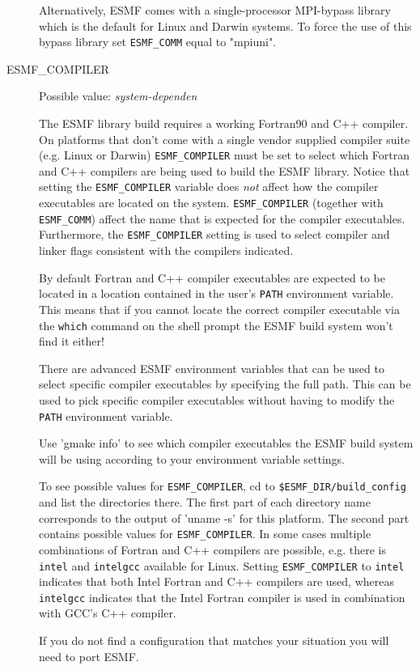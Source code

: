 \begin{description}
Alternatively, ESMF comes with a single-processor MPI-bypass library which is
the default for Linux and Darwin systems. To force the use of this bypass
library set {\tt ESMF\_COMM} equal to "mpiuni".

\item[ESMF\_COMPILER]
Possible value: {\em system-dependen}

The ESMF library build requires a working Fortran90 and C++ compiler. On 
platforms that don't come with a single vendor supplied compiler suite
(e.g. Linux or Darwin) {\tt ESMF\_COMPILER} must be set to select which Fortran
and C++ compilers are being used to build the ESMF library. Notice that setting
the {\tt ESMF\_COMPILER} variable does {\em not} affect how the compiler
executables are located on the system. {\tt ESMF\_COMPILER} (together with
{\tt ESMF\_COMM}) affect the name that is expected for the compiler executables.
Furthermore, the {\tt ESMF\_COMPILER} setting is used to select compiler and
linker flags consistent with the compilers indicated.

By default Fortran and C++ compiler executables are expected to be located in
a location contained in the user's {\tt PATH} environment variable. This means
that if you cannot locate the correct compiler executable via the {\tt which}
command on the shell prompt the ESMF build system won't find it either!

There are advanced ESMF environment variables that can be used to select 
specific compiler executables by specifying the full path. This can be used to
pick specific compiler executables without having to modify the {\tt PATH}
environment variable.

Use 'gmake info' to see which compiler executables the ESMF build system will
be using according to your environment variable settings.

To see possible values for {\tt ESMF\_COMPILER}, cd to 
{\tt \$ESMF\_DIR/build\_config} and list the directories there. The first part 
of each directory name corresponds to the output of 'uname -s' for this 
platform. The second part contains possible values for {\tt ESMF\_COMPILER}. In
some cases multiple combinations of Fortran and C++ compilers are possible, e.g.
there is {\tt intel} and {\tt intelgcc} available for Linux. Setting 
{\tt ESMF\_COMPILER} to {\tt intel} indicates that both Intel Fortran and 
C++ compilers are used, whereas {\tt intelgcc} indicates that the Intel Fortran
compiler is used in combination with GCC's C++ compiler.

If you do not find a configuration that matches your situation you will need to
port ESMF.


\end{description}
